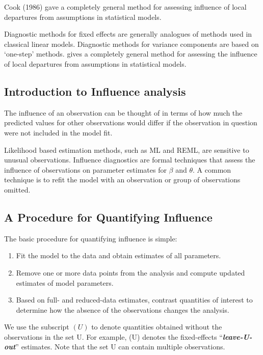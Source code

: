 \documentclass[12pt, a4paper]{report}
\theoremstyle{plain}
\theoremstyle{definition}
\theoremstyle{remark}
\begin{document}








Cook (1986) gave a completely general method for assessing influence of local departures from
assumptions in statistical models.

Diagnostic methods for fixed effects are generally analogues of methods used in classical linear models.
Diagnostic methods for variance components are based on `one-step' methods. \citet{cook86} gives a completely general method for assessing the influence of local departures from assumptions in statistical models. 

\subsection{Introduction to Influence analysis} %

The influence of an observation can be thought of in terms of how much the predicted values for other observations would differ if the observation in question were not included in the model fit.

Likelihood based estimation methods, such as ML and REML, are sensitive to unusual observations. Influence diagnostics are formal techniques that assess the influence of observations on parameter estimates for $\beta$ and $\theta$. A common technique is to refit the model with an observation or group of observations omitted.


\subsection{A Procedure for Quantifying Influence}  %
The basic procedure for quantifying influence is simple:

\begin{enumerate}
	\item Fit the model to the data and obtain estimates of all parameters.
	\item Remove one or more data points from the analysis and compute updated estimates of model parameters.
	\item Based on full- and reduced-data estimates, contrast quantities of interest to determine how the absence
	of the observations changes the analysis.
\end{enumerate}
We use the subscript $(U)$ to denote quantities obtained without the observations in the set U. For example,
(U) denotes the fixed-effects “\textit{\textbf{leave-U-out}}” estimates. Note that the set U can contain multiple observations.
\end{document}
